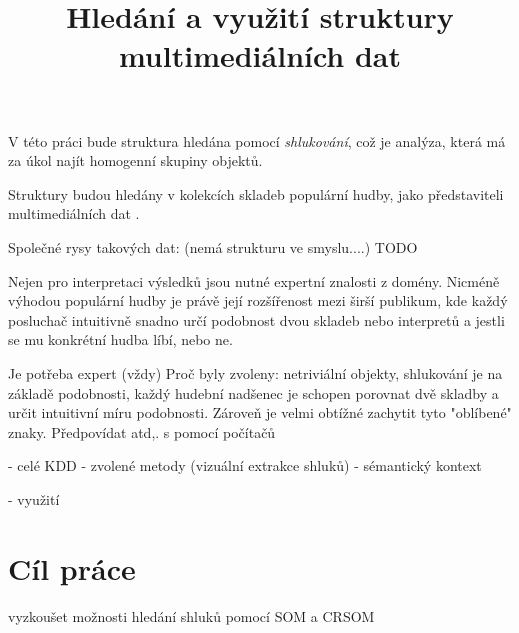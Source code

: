 \documentclass[thesis=M,czech]{FITthesis}[2012/06/26]
\title{Hledání a využití struktury multimediálních dat}
\begin{document}
\renewcommand\listingscaption{Ukázka}

\begin{introduction}

\cite{needed}




V této práci bude struktura hledána pomocí \textit{shlukování}, což je analýza, která má za úkol najít homogenní skupiny objektů. 

Struktury budou hledány v kolekcích skladeb populární hudby, jako představiteli multimediálních dat \cite{multimedia}. 

Společné rysy takových dat: (nemá strukturu ve smyslu....) TODO


Nejen pro interpretaci výsledků jsou nutné expertní znalosti z domény. Nicméně výhodou populární hudby je právě její rozšířenost mezi širší publikum, kde každý posluchač intuitivně snadno určí podobnost dvou skladeb nebo interpretů a jestli se mu konkrétní hudba líbí, nebo ne. 



Je potřeba expert (vždy)
Proč byly zvoleny: netriviální objekty, shlukování je na základě podobnosti, každý hudební nadšenec je schopen porovnat dvě skladby a určit intuitivní míru podobnosti. Zároveň je velmi obtížné zachytit tyto "oblíbené" znaky. Předpovídat atd,.  s pomocí počítačů


- celé KDD
- zvolené metody (vizuální extrakce shluků)
- sémantický kontext


- využití


	
	\section{Cíl práce}
	
	vyzkoušet možnosti hledání shluků pomocí SOM a CRSOM
\end{introduction}

\end{document}
